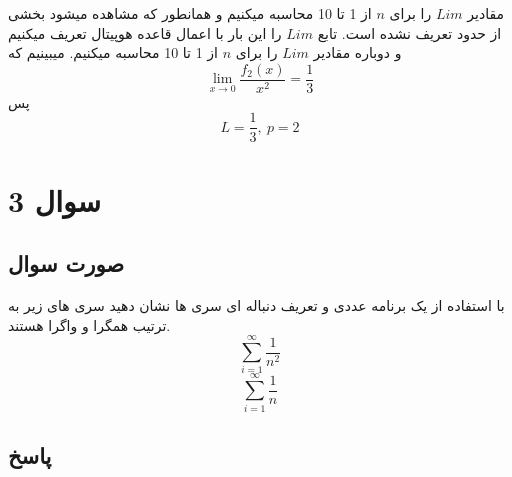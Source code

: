 \documentclass[12pt, letterpaper]{article}
\begin{document}
\vspace{5 mm}
مقادیر 
\(Lim\)
 را برای 
\(n\)
 از 1 تا 10 محاسبه میکنیم و همانطور که مشاهده میشود بخشی از حدود تعریف نشده است.
تابع \(Lim\) را این بار با اعمال قاعده هوپیتال تعریف میکنیم و دوباره مقادیر \(Lim\) را برای \(n\) از 1 تا 10 محاسبه میکنیم. میبینیم که
\[ \lim_{x\to 0}\frac {f_2(x)}{x^2} = \frac{1}{3}\]
پس 
\[ L = \frac{1}{3}, \: p = 2\]


\section{سوال 3}
\subsection{صورت سوال}
با استفاده از یک برنامه عددی و تعریف دنباله ای سری ها نشان دهید سری های زیر به ترتیب همگرا و واگرا هستند.
\[ \sum_{i=1}^{\infty} \frac {1}{n^2}\]
\[ \sum_{i=1}^{\infty} \frac {1}{n}\]



\subsection{پاسخ}
\end{document}
